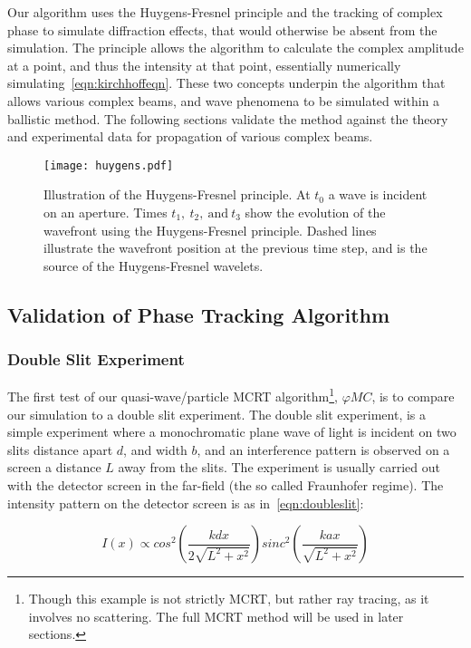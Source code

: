 \medskip

Our algorithm uses the Huygens-Fresnel principle and the tracking of complex phase to simulate diffraction effects, that would otherwise be absent from the simulation.
The principle allows the algorithm to calculate the complex amplitude at a point, and thus the intensity at that point, essentially numerically simulating~\cref{eqn:kirchhoffeqn}.
These two concepts underpin the algorithm that allows various complex beams, and wave phenomena to be simulated within a ballistic method. The following sections validate the method against the theory and experimental data for propagation of various complex beams.

\begin{figure}[!ht]
    \centering
    \texttt{[image: huygens.pdf]}
    \caption{Illustration of the Huygens-Fresnel principle. At $t_0$ a wave is incident on an aperture. Times $t_1,\ t_2,\ \text{and}\ t_3$ show the evolution of the wavefront using the Huygens-Fresnel principle. Dashed lines illustrate the wavefront position at the previous time step, and is the source of the Huygens-Fresnel wavelets.}
    \label{fig:huygensillis}
\end{figure}

\subsection{Validation of Phase Tracking Algorithm}

\subsubsection*{Double Slit Experiment}

The first test of our quasi-wave/particle MCRT algorithm\footnote{Though this example is not strictly MCRT, but rather ray tracing, as it involves no scattering. The full MCRT method will be used in later sections.}, $\varphi MC$, is to compare our simulation to a double slit experiment.
The double slit experiment, is a simple experiment where a monochromatic plane wave of light is incident on two slits distance apart $d$, and width $b$, and an interference pattern is observed on a screen a distance $L$ away from the slits. The experiment is usually carried out with the detector screen in the far-field (the so called Fraunhofer regime).
The intensity pattern on the detector screen is as in~\cref{eqn:doubleslit}:

\begin{equation}
    I(x) \propto cos^2\left(\frac{kdx}{2\sqrt{L^2+x^2}}\right)sinc^2\left(\frac{kax}{\sqrt{L^2+x^2}}\right)
    \label{eqn:doubleslit}
\end{equation}

